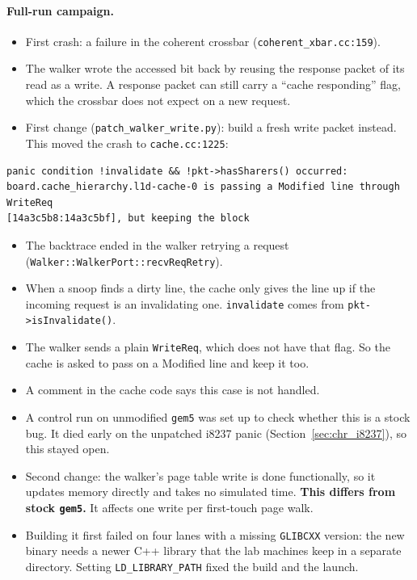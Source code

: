 \paragraph{Full-run campaign.}
\begin{itemize}
    \item First crash: a failure in the coherent crossbar (\texttt{coherent\_xbar.cc:159}).
    \item The walker wrote the accessed bit back by reusing the response packet of its read as a write. A response packet can still carry a ``cache responding'' flag, which the crossbar does not expect on a new request.
    \item First change (\texttt{patch\_walker\_write.py}): build a fresh write packet instead. This moved the crash to \texttt{cache.cc:1225}:
\end{itemize}
\begin{lstlisting}
panic condition !invalidate && !pkt->hasSharers() occurred:
board.cache_hierarchy.l1d-cache-0 is passing a Modified line through WriteReq
[14a3c5b8:14a3c5bf], but keeping the block
\end{lstlisting}
\begin{itemize}
    \item The backtrace ended in the walker retrying a request (\texttt{Walker::WalkerPort::recvReqRetry}).
    \item When a snoop finds a dirty line, the cache only gives the line up if the incoming request is an invalidating one. \texttt{invalidate} comes from \texttt{pkt->isInvalidate()}.
    \item The walker sends a plain \texttt{WriteReq}, which does not have that flag. So the cache is asked to pass on a Modified line and keep it too.
    \item A comment in the cache code says this case is not handled.
\end{itemize}

\begin{itemize}
    \item A control run on unmodified \texttt{gem5} was set up to check whether this is a stock bug. It died early on the unpatched i8237 panic (Section~\ref{sec:chr_i8237}), so this stayed open.
    \item Second change: the walker's page table write is done functionally, so it updates memory directly and takes no simulated time. \textbf{This differs from stock \texttt{gem5}.} It affects one write per first-touch page walk.
    \item Building it first failed on four lanes with a missing \texttt{GLIBCXX} version: the new binary needs a newer C++ library that the lab machines keep in a separate directory. Setting \texttt{LD\_LIBRARY\_PATH} fixed the build and the launch.
\end{itemize}

